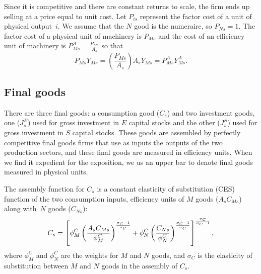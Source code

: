 \documentclass[12pt,fleqn]{article}
\begin{document}
{\normalsize Since it is competitive and there are constant returns to
scale, the firm ends up selling at a price equal to unit cost. Let $P_{is}$
represent the factor cost of a unit of physical output~$i.$ We assume that the $%
N$ good is the numeraire, so $P_{Ns}=1$. The factor cost of a physical unit
of machinery is $P_{Ms}$ and the cost of an efficiency unit of machinery is $%
P_{Ms}^{A}=\frac{P_{Ms}}{A_s}$ so that%
\begin{equation}
P_{Ms}Y_{Ms}=\left( \frac{P_{Ms}}{A_s}\right) A_s
Y_{Ms}=P_{Ms}^{A}Y_{Ms}^{A}.  \label{Mvalue}
\end{equation}%
}

\subsection{\protect\normalsize Final goods}

{\normalsize There are three final goods: a consumption good ($C_{s}$) and
two investment goods, one ($J_{s}^{E}$) used for gross investment in $E$
capital stocks and the other ($J_{s}^{S}$) used for gross investment in $S$
capital stocks. These goods are assembled by perfectly competitive final
goods firms that use as inputs the outputs of the two production sectors,
and these final goods are measured in efficiency units. When we find it
expedient for the exposition, we us an upper bar to denote final goods
measured in physical units. }

{\normalsize The assembly function for $C_{s}$ is a constant elasticity of
substitution (CES) function of the two consumption inputs, efficiency units
of $M$ goods ($A_sC_{Ms}$) along with\ $N$ goods ($C_{Ns}$):
\begin{equation}
C_{s}=\left[ \phi _{M}^{C}\left( \frac{A_s C_{Ms}}{\phi _{M}^{C}}\right) ^{%
\frac{\sigma _{C}-1}{\sigma _{C}}}+\phi _{N}^{C}\left( \frac{C_{Ns}}{\phi
_{N}^{C}}\right) ^{\frac{\sigma _{C}-1}{\sigma _{C}}}\right] ^{\frac{\sigma
_{C}}{\sigma _{C}-1}},
\end{equation}
where $\phi _{M}^{C}$ and $\phi _{N}^{C}$ are the weights for $M$ and $N$
goods, and $\sigma _{C}$ is the elasticity of substitution between $M$ and $%
N $ goods in the assembly of $C_{s}$. }
\end{document}
